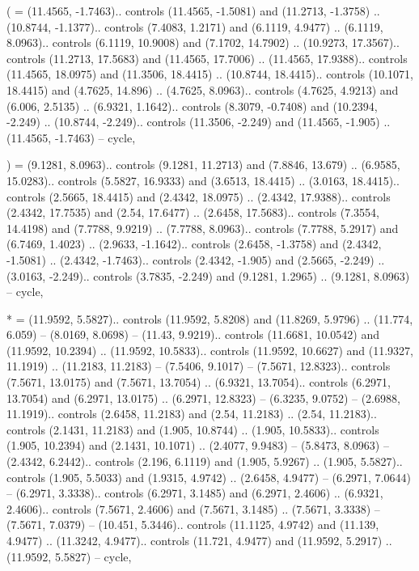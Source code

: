 ( = {(11.4565, -1.7463).. controls (11.4565, -1.5081) and (11.2713, -1.3758) .. (10.8744, -1.1377).. controls (7.4083, 1.2171) and (6.1119, 4.9477) .. (6.1119, 8.0963).. controls (6.1119, 10.9008) and (7.1702, 14.7902) .. (10.9273, 17.3567).. controls (11.2713, 17.5683) and (11.4565, 17.7006) .. (11.4565, 17.9388).. controls (11.4565, 18.0975) and (11.3506, 18.4415) .. (10.8744, 18.4415).. controls (10.1071, 18.4415) and (4.7625, 14.896) .. (4.7625, 8.0963).. controls (4.7625, 4.9213) and (6.006, 2.5135) .. (6.9321, 1.1642).. controls (8.3079, -0.7408) and (10.2394, -2.249) .. (10.8744, -2.249).. controls (11.3506, -2.249) and (11.4565, -1.905) .. (11.4565, -1.7463) -- cycle},

) = {(9.1281, 8.0963).. controls (9.1281, 11.2713) and (7.8846, 13.679) .. (6.9585, 15.0283).. controls (5.5827, 16.9333) and (3.6513, 18.4415) .. (3.0163, 18.4415).. controls (2.5665, 18.4415) and (2.4342, 18.0975) .. (2.4342, 17.9388).. controls (2.4342, 17.7535) and (2.54, 17.6477) .. (2.6458, 17.5683).. controls (7.3554, 14.4198) and (7.7788, 9.9219) .. (7.7788, 8.0963).. controls (7.7788, 5.2917) and (6.7469, 1.4023) .. (2.9633, -1.1642).. controls (2.6458, -1.3758) and (2.4342, -1.5081) .. (2.4342, -1.7463).. controls (2.4342, -1.905) and (2.5665, -2.249) .. (3.0163, -2.249).. controls (3.7835, -2.249) and (9.1281, 1.2965) .. (9.1281, 8.0963) -- cycle},

* = {(11.9592, 5.5827).. controls (11.9592, 5.8208) and (11.8269, 5.9796) .. (11.774, 6.059) -- (8.0169, 8.0698) -- (11.43, 9.9219).. controls (11.6681, 10.0542) and (11.9592, 10.2394) .. (11.9592, 10.5833).. controls (11.9592, 10.6627) and (11.9327, 11.1919) .. (11.2183, 11.2183) -- (7.5406, 9.1017) -- (7.5671, 12.8323).. controls (7.5671, 13.0175) and (7.5671, 13.7054) .. (6.9321, 13.7054).. controls (6.2971, 13.7054) and (6.2971, 13.0175) .. (6.2971, 12.8323) -- (6.3235, 9.0752) -- (2.6988, 11.1919).. controls (2.6458, 11.2183) and (2.54, 11.2183) .. (2.54, 11.2183).. controls (2.1431, 11.2183) and (1.905, 10.8744) .. (1.905, 10.5833).. controls (1.905, 10.2394) and (2.1431, 10.1071) .. (2.4077, 9.9483) -- (5.8473, 8.0963) -- (2.4342, 6.2442).. controls (2.196, 6.1119) and (1.905, 5.9267) .. (1.905, 5.5827).. controls (1.905, 5.5033) and (1.9315, 4.9742) .. (2.6458, 4.9477) -- (6.2971, 7.0644) -- (6.2971, 3.3338).. controls (6.2971, 3.1485) and (6.2971, 2.4606) .. (6.9321, 2.4606).. controls (7.5671, 2.4606) and (7.5671, 3.1485) .. (7.5671, 3.3338) -- (7.5671, 7.0379) -- (10.451, 5.3446).. controls (11.1125, 4.9742) and (11.139, 4.9477) .. (11.3242, 4.9477).. controls (11.721, 4.9477) and (11.9592, 5.2917) .. (11.9592, 5.5827) -- cycle},

